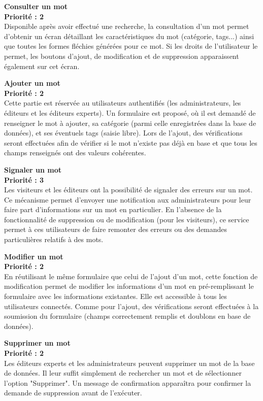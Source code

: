 \documentclass[12pt,a4paper]{article}
\begin{document}
\textbf{Consulter un mot} \\
\textbf{Priorité : 2} \\ 
Disponible après avoir effectué une recherche, la consultation d'un mot permet d'obtenir un écran détaillant les caractéristiques du mot (catégorie, tags...) ainsi que toutes les formes fléchies générées pour ce mot.
Si les droits de l'utilisateur le permet, les boutons d'ajout, de modification et de suppression apparaissent également sur cet écran.

\textbf{Ajouter un mot} \\
\textbf{Priorité : 2} \\ 
Cette partie est réservée au utilisateurs authentifiés (les administrateurs, les éditeurs et les éditeurs experts). 
Un formulaire est proposé, où il est demandé de renseigner le mot à ajouter, sa catégorie (parmi celle enregistrées dans la base de données), et ses éventuels tags (saisie libre).
Lors de l'ajout, des vérifications seront effectuées afin de vérifier si le mot n'existe pas déjà en base et que tous les champs renseignés ont des valeurs cohérentes.

\textbf{Signaler un mot} \\
\textbf{Priorité : 3} \\
Les visiteurs et les éditeurs ont la possibilité de signaler des erreurs sur un mot.
Ce mécanisme permet d'envoyer une notification aux administrateurs pour leur faire part d'informations sur un mot en particulier.
En l'absence de la fonctionnalité de suppression ou de modification (pour les visiteurs), ce service permet à ces utilisateurs de faire remonter des erreurs ou des demandes particulières relatifs à des mots.
 
\textbf{Modifier un mot} \\
\textbf{Priorité : 2} \\ 
En réutilisant le même formulaire que celui de l'ajout d'un mot, cette fonction de modification permet de modifier les informations d'un mot en pré-remplissant le formulaire avec les informations existantes. Elle est accessible à tous les utilisateurs connectés. Comme pour l'ajout, des vérifications seront effectuées à la soumission du formulaire (champs correctement remplis et doublons en base de données).

\textbf{Supprimer un mot} \\
\textbf{Priorité : 2} \\ 
Les éditeurs experts et les administrateurs peuvent supprimer un mot de la base de données. Il leur suffit simplement de rechercher un mot et de sélectionner l'option "Supprimer". Un message de confirmation apparaîtra pour confirmer la demande de suppression avant de l'exécuter.
\end{document}
